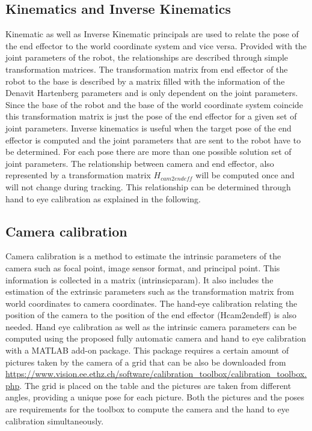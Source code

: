 \documentclass[letterpaper, 10 pt, conference]{IEEEconf}  %
\begin{document}
\subsection{Kinematics and Inverse Kinematics}
Kinematic as well as Inverse Kinematic principals are used to relate the pose of the end effector to the world coordinate system and vice versa. Provided with the joint parameters of the robot, the relationships are described through simple transformation matrices. The transformation matrix from end effector of the robot to the base is described by a matrix filled with the information of the Denavit Hartenberg parameters and is only dependent on the joint parameters. Since the base of the robot and the base of the world coordinate system coincide this transformation matrix is just the pose of the end effector for a given set of joint parameters. Inverse kinematics is useful when the target pose of the end effector is computed and the joint parameters that are sent to the robot have to be determined. For each pose there are more than one possible solution set of joint parameters. The relationship between camera and end effector, also represented by a transformation matrix $H_{cam2endeff}$ will be computed once and will not change during tracking. This relationship can be determined through hand to eye calibration as explained in the following.
\subsection{Camera calibration}
Camera calibration is a method to estimate the intrinsic  parameters of the camera such as focal point, image sensor format, and principal point. This information is collected in a matrix (intrinsicparam). It also includes the estimation of the extrinsic parameters such as the transformation matrix from world coordinates to camera coordinates. The hand-eye calibration relating the position of the camera to the position of the end effector (Hcam2endeff) is also needed. Hand eye calibration as well as the intrinsic camera parameters can be computed using the proposed fully automatic camera and hand to eye calibration with a MATLAB add-on package. This package requires a certain amount of pictures taken by the camera of a grid that can be also be downloaded from \url{https://www.vision.ee.ethz.ch/software/calibration_toolbox/calibration_toolbox.php}. The grid is placed on the table and the pictures are taken from different angles, providing a unique pose for each picture. Both the pictures and the poses are requirements for the toolbox to compute the camera and the hand to eye calibration simultaneously.
\end{document}
